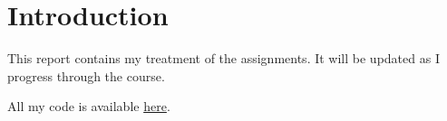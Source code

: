 \section{Introduction}
This report contains my treatment of the assignments. It will be updated as I progress through the course.

All my code is available \href{https://github.com/PhilipSoliman/applications-in-pdes-assignments.git}{here}.